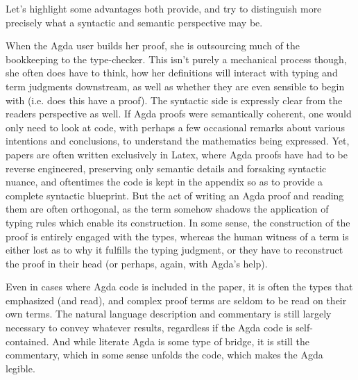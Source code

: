 Let's highlight some advantages both provide, and try to distinguish more
precisely what a syntactic and semantic perspective may be.

When the Agda user builds her proof, she is outsourcing much of the bookkeeping
to the type-checker. This isn't purely a mechanical process though, she often
does have to think, how her definitions will interact with typing and term
judgments downstream, as well as whether they are even sensible to begin with
(i.e. does this have a proof). The syntactic side is expressly clear from the
readers perspective as well. If Agda proofs were semantically coherent, one
would only need to look at code, with perhaps a few occasional remarks about
various intentions and conclusions, to understand the mathematics being
expressed. Yet, papers are often written exclusively in Latex, where Agda proofs
have had to be reverse engineered, preserving only semantic details and
forsaking syntactic nuance, and oftentimes the code is kept in the appendix so
as to provide a complete syntactic blueprint. But the act of writing an Agda
proof and reading them are often orthogonal, as the term somehow shadows the
application of typing rules which enable its construction. In some sense, the
construction of the proof is entirely engaged with the types, whereas the human
witness of a term is either lost as to why it fulfills the typing judgment, or
they have to reconstruct the proof in their head (or perhaps, again, with Agda's
help).

Even in cases where Agda code is included in the paper, it is often the types
that emphasized (and read), and complex proof terms are seldom to be read on
their own terms. The natural language description and commentary is still
largely necessary to convey whatever results, regardless if the Agda code is
self-contained. And while literate Agda is some type of bridge, it is still the
commentary, which in some sense unfolds the code, which makes the Agda legible.

